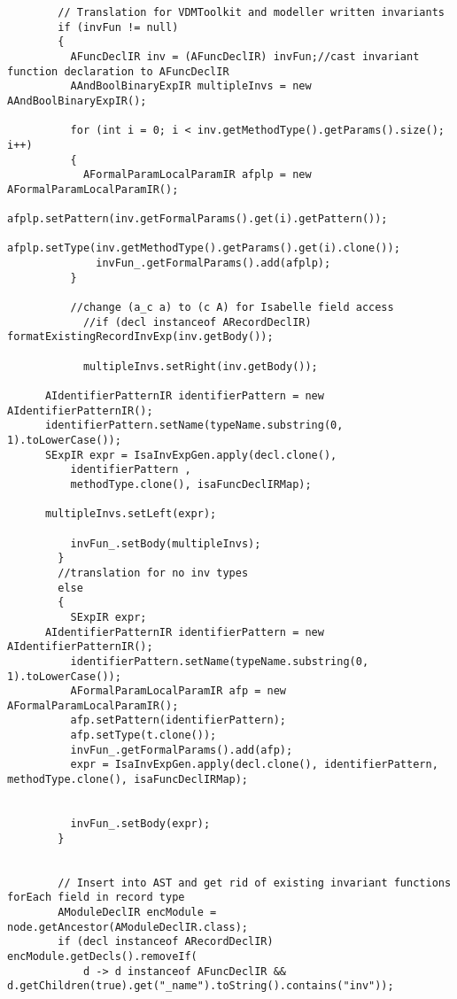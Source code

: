 \begin{appendices}
\begin{lstlisting}
          
          
  
        // Translation for VDMToolkit and modeller written invariants
        if (invFun != null)
        {
          AFuncDeclIR inv = (AFuncDeclIR) invFun;//cast invariant function declaration to AFuncDeclIR
          AAndBoolBinaryExpIR multipleInvs = new AAndBoolBinaryExpIR();
          
          for (int i = 0; i < inv.getMethodType().getParams().size(); i++)
          {
            AFormalParamLocalParamIR afplp = new AFormalParamLocalParamIR();
              afplp.setPattern(inv.getFormalParams().get(i).getPattern());
              afplp.setType(inv.getMethodType().getParams().get(i).clone());
              invFun_.getFormalParams().add(afplp);
          }
          
          //change (a_c a) to (c A) for Isabelle field access
            //if (decl instanceof ARecordDeclIR) formatExistingRecordInvExp(inv.getBody());
          
            multipleInvs.setRight(inv.getBody());
          
      AIdentifierPatternIR identifierPattern = new AIdentifierPatternIR();
      identifierPattern.setName(typeName.substring(0, 1).toLowerCase());
      SExpIR expr = IsaInvExpGen.apply(decl.clone(), 
          identifierPattern , 
          methodType.clone(), isaFuncDeclIRMap);
          
      multipleInvs.setLeft(expr);
          
          invFun_.setBody(multipleInvs);
        } 
        //translation for no inv types 
        else 
        {
          SExpIR expr;
      AIdentifierPatternIR identifierPattern = new AIdentifierPatternIR();
          identifierPattern.setName(typeName.substring(0, 1).toLowerCase());
          AFormalParamLocalParamIR afp = new AFormalParamLocalParamIR();
          afp.setPattern(identifierPattern);
          afp.setType(t.clone()); 
          invFun_.getFormalParams().add(afp);
          expr = IsaInvExpGen.apply(decl.clone(), identifierPattern, methodType.clone(), isaFuncDeclIRMap);
          
          
          invFun_.setBody(expr);
        }
        

        // Insert into AST and get rid of existing invariant functions forEach field in record type
        AModuleDeclIR encModule = node.getAncestor(AModuleDeclIR.class);
        if (decl instanceof ARecordDeclIR) encModule.getDecls().removeIf(
            d -> d instanceof AFuncDeclIR && d.getChildren(true).get("_name").toString().contains("inv"));
        

\end{lstlisting}
\end{appendices}
